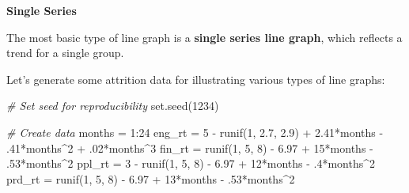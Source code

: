 \documentclass[
]{book}
\newenvironment{Shaded}{\begin{snugshade}}{\end{snugshade}}
\newcommand{\CommentTok}[1]{\textcolor[rgb]{0.56,0.35,0.01}{\textit{#1}}}
\newcommand{\DecValTok}[1]{\textcolor[rgb]{0.00,0.00,0.81}{#1}}
\newcommand{\FloatTok}[1]{\textcolor[rgb]{0.00,0.00,0.81}{#1}}
\newcommand{\FunctionTok}[1]{\textcolor[rgb]{0.00,0.00,0.00}{#1}}
\newcommand{\NormalTok}[1]{#1}
\newcommand{\OtherTok}[1]{\textcolor[rgb]{0.56,0.35,0.01}{#1}}
\newcommand{\SpecialCharTok}[1]{\textcolor[rgb]{0.00,0.00,0.00}{#1}}
\begin{document}
\textbf{Single Series}

The most basic type of line graph is a \textbf{single series line graph}, which reflects a trend for a single group.

Let's generate some attrition data for illustrating various types of line graphs:

\begin{Shaded}
\begin{Highlighting}[]
\CommentTok{\# Set seed for reproducibility}
\FunctionTok{set.seed}\NormalTok{(}\DecValTok{1234}\NormalTok{)}

\CommentTok{\# Create data}
\NormalTok{months }\OtherTok{=} \DecValTok{1}\SpecialCharTok{:}\DecValTok{24}
\NormalTok{eng\_rt }\OtherTok{=} \DecValTok{5} \SpecialCharTok{{-}} \FunctionTok{runif}\NormalTok{(}\DecValTok{1}\NormalTok{, }\FloatTok{2.7}\NormalTok{, }\FloatTok{2.9}\NormalTok{) }\SpecialCharTok{+} \FloatTok{2.41}\SpecialCharTok{*}\NormalTok{months }\SpecialCharTok{{-}}\NormalTok{ .}\DecValTok{41}\SpecialCharTok{*}\NormalTok{months}\SpecialCharTok{\^{}}\DecValTok{2} \SpecialCharTok{+}\NormalTok{ .}\DecValTok{02}\SpecialCharTok{*}\NormalTok{months}\SpecialCharTok{\^{}}\DecValTok{3}
\NormalTok{fin\_rt }\OtherTok{=} \FunctionTok{runif}\NormalTok{(}\DecValTok{1}\NormalTok{, }\DecValTok{5}\NormalTok{, }\DecValTok{8}\NormalTok{) }\SpecialCharTok{{-}} \FloatTok{6.97} \SpecialCharTok{+} \DecValTok{15}\SpecialCharTok{*}\NormalTok{months }\SpecialCharTok{{-}}\NormalTok{ .}\DecValTok{53}\SpecialCharTok{*}\NormalTok{months}\SpecialCharTok{\^{}}\DecValTok{2}
\NormalTok{ppl\_rt }\OtherTok{=} \DecValTok{3} \SpecialCharTok{{-}} \FunctionTok{runif}\NormalTok{(}\DecValTok{1}\NormalTok{, }\DecValTok{5}\NormalTok{, }\DecValTok{8}\NormalTok{) }\SpecialCharTok{{-}} \FloatTok{6.97} \SpecialCharTok{+} \DecValTok{12}\SpecialCharTok{*}\NormalTok{months }\SpecialCharTok{{-}}\NormalTok{ .}\DecValTok{4}\SpecialCharTok{*}\NormalTok{months}\SpecialCharTok{\^{}}\DecValTok{2}
\NormalTok{prd\_rt }\OtherTok{=} \FunctionTok{runif}\NormalTok{(}\DecValTok{1}\NormalTok{, }\DecValTok{5}\NormalTok{, }\DecValTok{8}\NormalTok{) }\SpecialCharTok{{-}} \FloatTok{6.97} \SpecialCharTok{+} \DecValTok{13}\SpecialCharTok{*}\NormalTok{months }\SpecialCharTok{{-}}\NormalTok{ .}\DecValTok{53}\SpecialCharTok{*}\NormalTok{months}\SpecialCharTok{\^{}}\DecValTok{2}


\end{Highlighting}
\end{Shaded}
\end{document}
